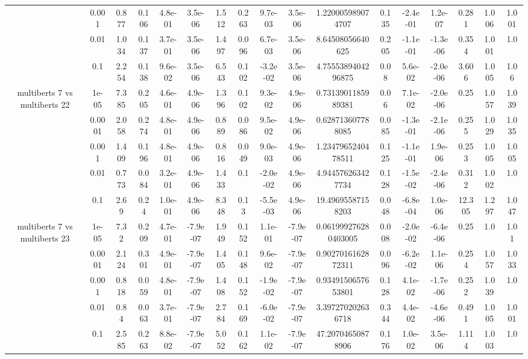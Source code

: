 \begin{tabular}{|c|c|c|c|c|c|c|c|c|c|c|c|c|c|c|c|c|}
 & 0.001 & 0.877 & 0.106 & 4.8e-01 & 3.5e-06 & 1.512 & 0.263 & 9.7e-03 & 3.5e-06 & 1.220005989074707 & 0.135 & -2.4e-01 & 1.2e-07 & 0.281 & 1.006 & 1.001 \\
 & 0.01 & 1.034 & 0.137 & 3.7e-01 & 3.5e-06 & 1.497 & 0.096 & 6.7e-03 & 3.5e-06 & 8.64508056640625 & 0.205 & -1.1e-01 & -1.3e-06 & 0.354 & 1.001 & 1.0 \\
 & 0.1 & 2.254 & 0.138 & 9.6e-02 & 3.5e-06 & 6.543 & 0.102 & -3.2e-02 & 3.5e-06 & 4.7555389404296875 & 0.08 & 5.6e-02 & -2.0e-06 & 3.606 & 1.005 & 1.06 \\
\hline
\multirow{5}{*}{multiberts 7 vs multiberts 22} & 1e-05 & 7.385 & 0.205 & 4.6e-01 & 4.9e-06 & 1.396 & 0.102 & 9.3e-02 & 4.9e-06 & 0.7313901185989381 & 0.06 & 7.1e-02 & -2.0e-06 & 0.25 & 1.057 & 1.039 \\
 & 0.0001 & 2.058 & 0.274 & 4.8e-01 & 4.9e-06 & 0.889 & 0.086 & 9.5e-02 & 4.9e-06 & 0.628713607788085 & 0.085 & -1.3e-01 & -2.1e-06 & 0.255 & 1.029 & 1.035 \\
 & 0.001 & 1.409 & 0.196 & 4.8e-01 & 4.9e-06 & 0.816 & 0.049 & 9.0e-03 & 4.9e-06 & 1.2347965240478511 & 0.125 & -1.1e-01 & 1.9e-06 & 0.253 & 1.005 & 1.005 \\
 & 0.01 & 0.773 & 0.084 & 3.2e-01 & 4.9e-06 & 1.433 & 0.1 & -2.0e-02 & 4.9e-06 & 4.944576263427734 & 0.128 & -1.5e-02 & -2.4e-06 & 0.312 & 1.002 & 1.0 \\
 & 0.1 & 2.69 & 0.24 & 1.0e-01 & 4.9e-06 & 8.348 & 0.13 & -5.5e-03 & 4.9e-06 & 19.49695587158203 & 0.048 & -6.8e-04 & 1.0e-06 & 12.305 & 1.297 & 1.047 \\
\hline
\multirow{5}{*}{multiberts 7 vs multiberts 23} & 1e-05 & 7.32 & 0.209 & 4.7e-01 & -7.9e-07 & 1.949 & 0.152 & 1.1e-01 & -7.9e-07 & 0.061999276280403005 & 0.008 & -2.0e-02 & -6.4e-06 & 0.25 & 1.0 & 1.01 \\
 & 0.0001 & 2.124 & 0.301 & 4.9e-01 & -7.9e-07 & 1.405 & 0.148 & 9.6e-02 & -7.9e-07 & 0.9027016162872311 & 0.096 & -6.2e-02 & 1.1e-06 & 0.254 & 1.057 & 1.033 \\
 & 0.001 & 0.818 & 0.059 & 4.8e-01 & -7.9e-07 & 1.408 & 0.152 & -1.9e-02 & -7.9e-07 & 0.9349150657653801 & 0.128 & 4.1e-02 & -1.7e-06 & 0.252 & 1.039 & 1.0 \\
 & 0.01 & 0.84 & 0.063 & 3.7e-01 & -7.9e-07 & 2.784 & 0.169 & -6.0e-02 & -7.9e-07 & 3.397270202636718 & 0.344 & 4.4e-02 & -4.6e-06 & 0.491 & 1.005 & 1.001 \\
 & 0.1 & 2.585 & 0.263 & 8.8e-02 & -7.9e-07 & 5.052 & 0.162 & 1.1e-02 & -7.9e-07 & 47.20704650878906 & 0.176 & 1.0e-02 & 3.5e-06 & 1.114 & 1.003 & 1.0 \\

\end{tabular}
